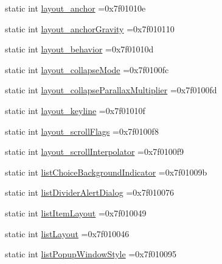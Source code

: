 \begin{DoxyCompactItemize}
\item 
static int \hyperlink{classandroid_1_1support_1_1v7_1_1cardview_1_1R_1_1attr_afc4b9010c3937b0764107dd38f877e13}{layout\+\_\+anchor} =0x7f01010e
\item 
static int \hyperlink{classandroid_1_1support_1_1v7_1_1cardview_1_1R_1_1attr_a25058deb29377972d2da6be407edfddc}{layout\+\_\+anchor\+Gravity} =0x7f010110
\item 
static int \hyperlink{classandroid_1_1support_1_1v7_1_1cardview_1_1R_1_1attr_a407bbdce0d48daa5f8c2bf959a52d866}{layout\+\_\+behavior} =0x7f01010d
\item 
static int \hyperlink{classandroid_1_1support_1_1v7_1_1cardview_1_1R_1_1attr_ad533ba0bfa6adac0af8c0f41f719edef}{layout\+\_\+collapse\+Mode} =0x7f0100fc
\item 
static int \hyperlink{classandroid_1_1support_1_1v7_1_1cardview_1_1R_1_1attr_a4df7b2b53c53ff48c94baa005dce4ec5}{layout\+\_\+collapse\+Parallax\+Multiplier} =0x7f0100fd
\item 
static int \hyperlink{classandroid_1_1support_1_1v7_1_1cardview_1_1R_1_1attr_a0173619a13c61cef19ff10fee171e66a}{layout\+\_\+keyline} =0x7f01010f
\item 
static int \hyperlink{classandroid_1_1support_1_1v7_1_1cardview_1_1R_1_1attr_a3b3c1117c3a692d7602eb20227ea8e17}{layout\+\_\+scroll\+Flags} =0x7f0100f8
\item 
static int \hyperlink{classandroid_1_1support_1_1v7_1_1cardview_1_1R_1_1attr_ac91c12ea99bd6244f37f8789fbc60d94}{layout\+\_\+scroll\+Interpolator} =0x7f0100f9
\item 
static int \hyperlink{classandroid_1_1support_1_1v7_1_1cardview_1_1R_1_1attr_a0e0fd170b675856c067c0258df0adf4b}{list\+Choice\+Background\+Indicator} =0x7f01009b
\item 
static int \hyperlink{classandroid_1_1support_1_1v7_1_1cardview_1_1R_1_1attr_a2782cc47afc140978337e9de1c8f70ec}{list\+Divider\+Alert\+Dialog} =0x7f010076
\item 
static int \hyperlink{classandroid_1_1support_1_1v7_1_1cardview_1_1R_1_1attr_afd49174db57b9f2cf1ab07944689c3ef}{list\+Item\+Layout} =0x7f010049
\item 
static int \hyperlink{classandroid_1_1support_1_1v7_1_1cardview_1_1R_1_1attr_a1180c355e7f55ee08b35f8f665cb9a6d}{list\+Layout} =0x7f010046
\item 
static int \hyperlink{classandroid_1_1support_1_1v7_1_1cardview_1_1R_1_1attr_a1e3167b62207f7538133ab484f1b1f5d}{list\+Popup\+Window\+Style} =0x7f010095
\item 

\end{DoxyCompactItemize}
